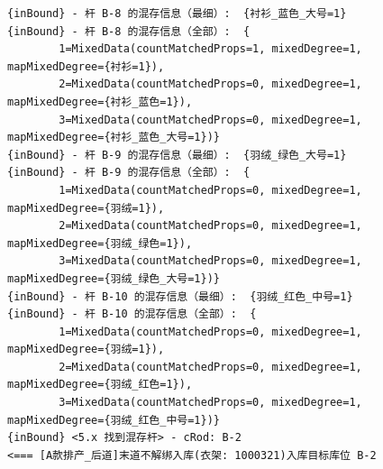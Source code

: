 {\begin{verbatim}
{inBound} - 杆 B-8 的混存信息（最细）:  {衬衫_蓝色_大号=1}
{inBound} - 杆 B-8 的混存信息（全部）:  {
		1=MixedData(countMatchedProps=1, mixedDegree=1, mapMixedDegree={衬衫=1}), 
		2=MixedData(countMatchedProps=0, mixedDegree=1, mapMixedDegree={衬衫_蓝色=1}), 
		3=MixedData(countMatchedProps=0, mixedDegree=1, mapMixedDegree={衬衫_蓝色_大号=1})}
{inBound} - 杆 B-9 的混存信息（最细）:  {羽绒_绿色_大号=1}
{inBound} - 杆 B-9 的混存信息（全部）:  {
		1=MixedData(countMatchedProps=0, mixedDegree=1, mapMixedDegree={羽绒=1}), 
		2=MixedData(countMatchedProps=0, mixedDegree=1, mapMixedDegree={羽绒_绿色=1}), 
		3=MixedData(countMatchedProps=0, mixedDegree=1, mapMixedDegree={羽绒_绿色_大号=1})}
{inBound} - 杆 B-10 的混存信息（最细）:  {羽绒_红色_中号=1}
{inBound} - 杆 B-10 的混存信息（全部）:  {
		1=MixedData(countMatchedProps=0, mixedDegree=1, mapMixedDegree={羽绒=1}), 
		2=MixedData(countMatchedProps=0, mixedDegree=1, mapMixedDegree={羽绒_红色=1}), 
		3=MixedData(countMatchedProps=0, mixedDegree=1, mapMixedDegree={羽绒_红色_中号=1})}
{inBound} <5.x 找到混存杆> - cRod: B-2
<=== [A款排产_后道]末道不解绑入库(衣架: 1000321)入库目标库位 B-2


\end{verbatim}}
